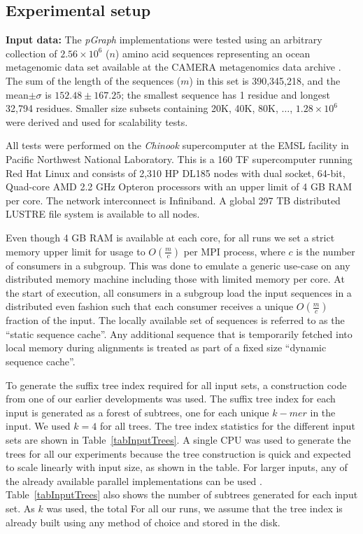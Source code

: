 \documentclass[10pt,journal,letterpaper,compsoc]{IEEEtran}
\begin{document}
\subsection{Experimental setup} 


{\bf Input data:} The {\it pGraph} implementations were tested using an arbitrary collection of $2.56\times 10^6$ ($n$) amino acid sequences representing an ocean metagenomic data set available at the CAMERA metagenomics data archive \cite{CAMERA}. The sum of the length of the sequences ($m$) in this set is 390,345,218, and the mean$\pm\sigma$ is $152.48\pm 167.25$; the smallest sequence has 1 residue and longest 32,794 residues. Smaller size subsets containing 20K, 40K, 80K, $\ldots$, $1.28\times 10^6$  were derived and used for scalability tests.


 All tests were performed on the {\it Chinook} supercomputer at the EMSL facility in Pacific Northwest National Laboratory. This is a 160 TF supercomputer running Red Hat Linux and consists of 2,310 HP DL185 nodes with dual socket, 64-bit, Quad-core AMD 2.2 GHz Opteron processors with an upper limit of 4 GB RAM per core. The network interconnect is Infiniband. A global 297 TB distributed LUSTRE file system is available to all nodes. 


 Even though 4 GB RAM is available at each core, for all runs we set a strict memory upper limit for usage to $O(\frac{m}{c})$ per MPI process, where $c$ is the number of consumers in a subgroup. This was done to emulate a generic use-case on any distributed memory machine including those with limited memory per core. At the start of execution, all consumers in a subgroup load the input sequences in a distributed even fashion such that each consumer receives a unique $O(\frac{m}{c})$ fraction of the input. The locally available set of sequences is referred to as the ``static sequence cache''. Any additional sequence that is temporarily fetched into local memory during alignments is treated as part of a fixed size ``dynamic sequence cache''.

To generate the suffix tree index required for all input sets, a construction code from one of our earlier developments \cite{KalyanaramanJPDC07} was used. The suffix tree index for each input is generated as a forest of subtrees, one for each unique $k-mer$ in the input. We used $k=4$ for all trees. The tree index statistics for the different input sets are shown in Table~\ref{tabInputTrees}. A single CPU was used to generate the trees for all our experiments because the tree construction is quick and expected to scale linearly with input size, as shown in the table. For larger inputs, any of the already available parallel implementations can be used \cite{Ghoting09,KalyanaramanJPDC07}. Table~\ref{tabInputTrees} also shows the number of subtrees generated for each input set. As $k$ was used, the total   For all our runs, we assume that the tree index is already built using any method of choice and stored in the disk.
\end{document}
